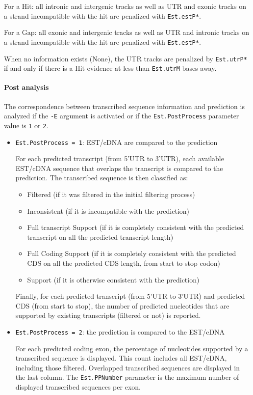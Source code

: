 For a Hit: all intronic and intergenic tracks as well as UTR and
exonic tracks on a strand incompatible with the hit are penalized with
\texttt{Est.estP*}.

For a Gap: all exonic and intergenic tracks as well as UTR and
intronic tracks on a strand incompatible with the hit are penalized with
\texttt{Est.estP*}.

When no information exists (None), the UTR tracks are penalized by
\texttt{Est.utrP*} if and only if there is a Hit evidence at less than
\texttt{Est.utrM} bases away.

\paragraph{Post analysis}

The correspondence between transcribed sequence information and
prediction is analyzed if the \texttt{-E} argument
 is activated or if
the \texttt{Est.PostProcess} parameter value is \texttt{1} or \texttt{2}.

\begin{itemize}
 \item \texttt{Est.PostProcess = 1}: EST/cDNA are compared to the prediction

For each predicted transcript (from 5'UTR to 3'UTR), each available
EST/cDNA sequence that overlaps the transcript is compared to the
prediction. The transcribed sequence is then classified as:
\begin{itemize}
\item Filtered (if it was filtered in the initial filtering process)
\item Inconsistent (if it is incompatible with the prediction)
\item Full transcript Support (if it is completely consistent with the
  predicted transcript on all the predicted transcript length)
\item Full Coding Support (if it is completely consistent with the
  predicted CDS on all the predicted CDS length, from start to stop
  codon)
\item Support (if it is otherwise consistent with the prediction)
\end{itemize}
Finally, for each predicted transcript (from 5'UTR to 3'UTR) and
predicted CDS (from start to stop), the number of predicted
nucleotides that are supported by existing transcripts (filtered or
not) is reported.

 \item \texttt{Est.PostProcess = 2}: the prediction is compared to the EST/cDNA

For each predicted coding exon, the percentage of nucleotides
supported by a transcribed sequence is displayed. This count includes
all EST/cDNA, including those filtered. 
Overlapped transcribed sequences are displayed in the last column.
The \texttt{Est.PPNumber} parameter is the maximum number of displayed 
transcribed sequences per exon.
\end{itemize}


